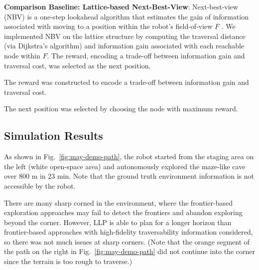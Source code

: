 \documentclass[letterpaper]{article} %
\newcommand{\ph}[1]{{\textbf{#1}:}} %
\begin{document}
\ph{Comparison Baseline: Lattice-based Next-Best-View}
Next-best-view (NBV) is a one-step lookahead algorithm that estimates the gain of information associated with moving to a position within the robot's field-of-view $F$ \cite{bircher2016receding}. We implemented NBV on the lattice structure by computing the traversal distance (via Dijkstra's algorithm) and information gain associated with each reachable node within $F$. The reward, encoding a trade-off between information gain and traversal cost, was selected as the next position. 

The reward was constructed to encode a trade-off between information gain and traversal cost.

The next position was selected by choosing the node with maximum reward. 


\subsection{Simulation Results}


As shown in Fig.~\ref{fig:may-demo-path}, the robot started from the staging area on the left (white open-space area) and autonomously explored the maze-like cave over 800 m in 23 min.
Note that the ground truth environment information is not accessible by the robot.

There are many sharp corned in the environment, where the frontier-based exploration approaches may fail to detect the frontiers and abandon exploring beyond the corner.
However, LLP is able to plan for a longer horizon than frontier-based approaches with high-fidelity traversability information considered, so there was not much issues at sharp corners.
(Note that the orange segment of the path on the right in Fig.~\ref{fig:may-demo-path} did not continue into the corner since the terrain is too rough to traverse.)
\end{document}
